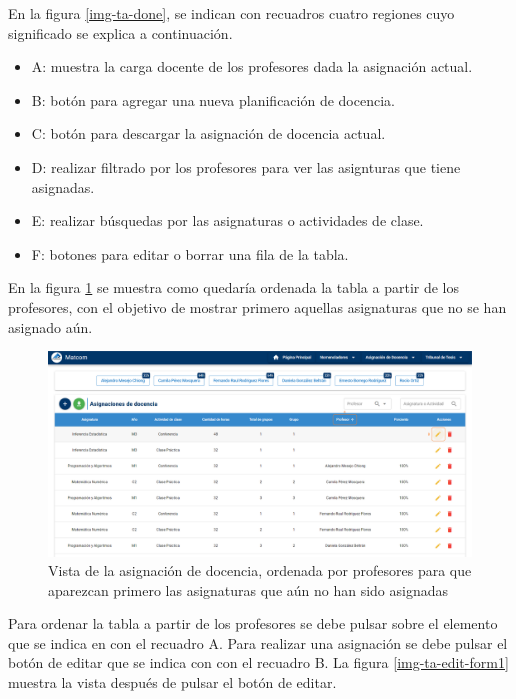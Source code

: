 En la figura \ref{img-ta-done},
se indican con recuadros cuatro regiones cuyo significado se explica a continuación.

\begin{itemize}
    \item A: muestra la carga docente de los profesores dada la asignación actual.
    \item B: botón para agregar una nueva planificación de docencia.
    \item C: botón para descargar la asignación de docencia actual.
    \item D: realizar filtrado por los profesores para ver las asignturas que tiene asignadas.
    \item E: realizar búsquedas por las asignaturas o actividades de clase.
    \item F: botones para editar o borrar una fila de la tabla.  
\end{itemize}



En la figura \ref{img-ta-ordering} se muestra como quedaría ordenada la tabla a partir de los profesores,
con el objetivo de mostrar primero aquellas 
asignaturas que no se han asignado aún.


\begin{figure}[H]
    \includegraphics[scale=0.3]{Graphics/Implementation/Docencia/AD-sin-asignar.png}
    \caption{Vista de la asignación de docencia, ordenada por profesores para que aparezcan primero las asignaturas que aún no han sido asignadas}
    \label{img-ta-ordering}
\end{figure}


Para ordenar la tabla a partir de los profesores se debe pulsar sobre el elemento que se indica en 
con el recuadro A. Para realizar una asignación se debe pulsar el botón de editar que se indica con
con el recuadro B. La figura \ref{img-ta-edit-form1} muestra la vista después de pulsar el botón de 
editar.  



